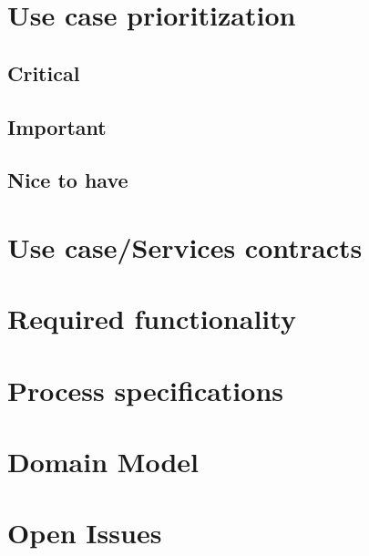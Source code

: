 \documentclass[a4paper, 10pt, oneside]{report}
\begin{document}
	\section{Use case prioritization}
		\subsection{Critical}
		\subsection{Important}
		\subsection{Nice to have}
	\section{Use case/Services contracts}

\newpage

\newpage

\newpage

\newpage

\newpage

\newpage

\newpage

\newpage

\newpage

\newpage

\newpage

\newpage

\section{Required functionality}
\section{Process specifications}
\section{Domain Model}
\section{Open Issues}
\end{document}
